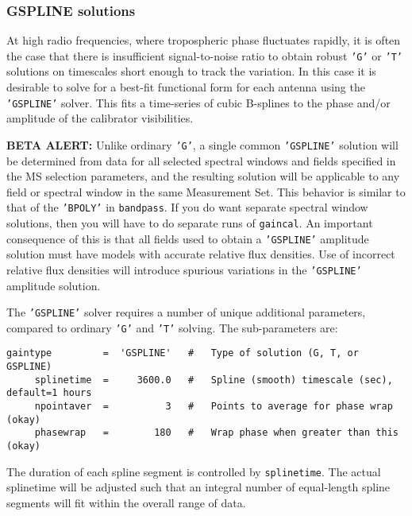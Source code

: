 \subsubsection{GSPLINE solutions}
\label{section:cal.solve.gain.gspline}

At high radio frequencies, where tropospheric phase fluctuates
rapidly, it is often the case that there is insufficient
signal-to-noise ratio to obtain robust {\tt 'G'} or {\tt 'T'}
solutions on timescales short enough to track the 
variation.  In this case it is desirable to solve for a best-fit
functional form for each antenna using the {\tt 'GSPLINE'} solver.  
This fits a time-series of cubic B-splines to the phase and/or
amplitude of the calibrator visibilities.  

{\bf BETA ALERT:} Unlike ordinary {\tt 'G'}, a single common 
{\tt 'GSPLINE'} solution will be determined from data for all selected 
spectral windows and fields specified in the MS selection parameters,
and the resulting solution will be applicable to any field or spectral
window in the same Measurement Set.  This behavior is similar to that
of the {\tt 'BPOLY'} in {\tt bandpass}.  If you do want separate
spectral window solutions, then you will have to do separate runs
of {\tt gaincal}.  An important consequence of this is that all
fields used to obtain a {\tt 'GSPLINE'} amplitude solution must have
models with accurate relative flux densities.  Use of incorrect
relative flux densities will introduce spurious variations in the
{\tt 'GSPLINE'} amplitude solution.

The {\tt 'GSPLINE'} solver requires a number of unique additional parameters,
compared to ordinary {\tt 'G'} and {\tt 'T'} solving.  The sub-parameters are:
\small
\begin{verbatim}
gaintype         =  'GSPLINE'   #   Type of solution (G, T, or GSPLINE)
     splinetime  =     3600.0   #   Spline (smooth) timescale (sec), default=1 hours
     npointaver  =          3   #   Points to average for phase wrap (okay)
     phasewrap   =        180   #   Wrap phase when greater than this (okay)
\end{verbatim}
\normalsize

The duration of each spline segment is controlled by {\tt splinetime}.
The actual splinetime will be adjusted such that an integral number of
equal-length spline segments will fit within the overall range of
data.

